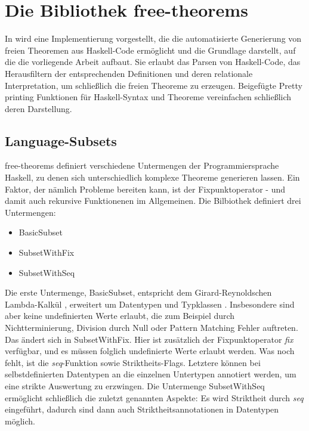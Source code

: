 \documentclass[11pt]{article} %
\begin{document}
\section{Die Bibliothek free-theorems}

In \cite{freetheorems} wird eine Implementierung vorgestellt, die die automatisierte Generierung von freien Theoremen aus
Haskell-Code ermöglicht und die Grundlage darstellt, auf die die vorliegende Arbeit aufbaut.
Sie erlaubt das Parsen von Haskell-Code, das Herausfiltern der entsprechenden Definitionen und deren relationale
Interpretation, um schließlich die freien Theoreme zu erzeugen.
Beigefügte Pretty printing Funktionen für Haskell-Syntax und Theoreme vereinfachen schließlich deren Darstellung.

\subsection{Language-Subsets}

free-theorems definiert verschiedene Untermengen der Programmiersprache Haskell, zu denen sich unterschiedlich komplexe
Theoreme generieren lassen. Ein Faktor, der nämlich Probleme bereiten kann, ist der Fixpunktoperator - und damit auch rekursive
Funktionenen im Allgemeinen.
Die Bilbiothek definiert drei Untermengen:

\begin{itemize}
   \item BasicSubset
   \item SubsetWithFix
   \item SubsetWithSeq
\end{itemize}

Die erste Untermenge, BasicSubset, entspricht dem Girard-Reynoldschen Lambda-Kalkül \cite{bla}, erweitert um Datentypen und
Typklassen \cite{freetheorems}. Insbesondere sind aber keine undefinierten Werte erlaubt, die zum Beispiel durch Nichtterminierung,
Division durch Null oder Pattern Matching Fehler auftreten.
Das ändert sich in SubsetWithFix. Hier ist zusätzlich der Fixpunktoperator \textit{fix} verfügbar, und es müssen folglich undefinierte
Werte erlaubt werden. Was noch fehlt, ist die \textit{seq}-Funktion sowie Striktheits-Flags. Letztere können bei selbstdefinierten
Datentypen an die einzelnen Untertypen  annotiert werden,
um eine strikte Auswertung zu erzwingen.
Die Untermenge SubsetWithSeq ermöglicht schließlich die zuletzt genannten Aspekte: Es wird Striktheit durch \textit{seq}
eingeführt, dadurch sind dann auch Striktheitsannotationen in Datentypen möglich.
\end{document}
